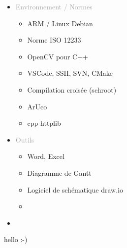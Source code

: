\documentclass{article}
\begin{document}
\begin{tabular}
\begin{itemize}[label={}, topsep=0pt, partopsep=0pt, itemsep=0.5pt, parsep=2pt]
\begin{itemize}
            \item[\textcolor{white}{\checkmark}] \textcolor{gray!80}{} %
            \item[\textcolor{white}{\checkmark}] \textcolor{gray!80}{} %
        \end{itemize}
        \item \textcolor{darkGray}{Environnement / Normes} 
        \begin{itemize}
        [label={\textcolor{gray!80}{\checkmark}}, topsep=0pt, partopsep=0pt, itemsep=0.5pt, parsep=2pt] 
            \item \textcolor{gray!80}{ARM / Linux Debian}
            \item \textcolor{gray!80}{Norme ISO 12233}
            \item \textcolor{gray!80}{OpenCV pour C++}
            \item \textcolor{gray!80}{VSCode, SSH, SVN, CMake}
            \item \textcolor{gray!80}{Compilation croisée (schroot)}
            \item \textcolor{gray!80}{ArUco}
            \item \textcolor{gray!80}{cpp-httplib} 
        \end{itemize}
        \item \textcolor{darkGray}{Outils}
        \begin{itemize}
        [label={\textcolor{gray!80}{\checkmark}}, topsep=0pt, partopsep=0pt, itemsep=0.5pt, parsep=2pt] 
            \item \textcolor{gray!80}{Word, Excel}
            \item \textcolor{gray!80}{Diagramme de Gantt}
            \item \textcolor{gray!80}{Logiciel de schématique draw.io}
            \item[\textcolor{white}{\checkmark}] \textcolor{gray!80}{} %
        \end{itemize}
        \item \textcolor{darkGray}{}
    \end{itemize}
\end{tabular}



\newpage
\thispagestyle{pro_experience_linxens}

hello :-)
\end{document}
